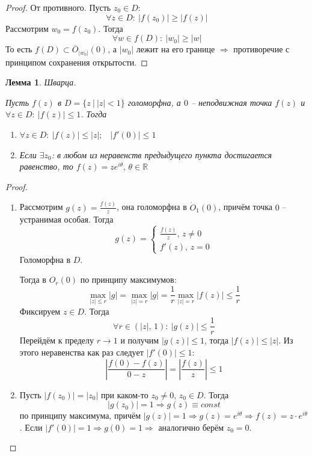 \documentclass[a4paper,12pt]{article}
\renewcommand{\leq}{\ensuremath{\leqslant}}
\renewcommand{\geq}{\ensuremath{\geqslant}}
\theoremstyle{plain}
\newtheorem{lemma}{Лемма}[section]
\theoremstyle{definition}
\theoremstyle{remark}
\begin{document}
\begin{proof}
	От противного. Пусть $z_0 \in D$:
	\[
		\forall z \in D :\: \vert f(z_0)\vert \geq \vert f(z)\vert
	\]
	Рассмотрим $w_0 = f(z_0)$. Тогда
	\[
		\forall w \in f(D) :\: \vert w_0\vert \geq \vert w\vert
	\]
	То есть $f(D) \subset \overline{O}_{\vert w_0\vert}(0)$, а $\vert w_0\vert$ лежит на его границе $\Rightarrow$ противоречие с принципом сохранения открытости.
\end{proof}

\begin{lemma}
	Шварца.

	Пусть $f(z)$ в $D = \{z \:\vert\: \vert z\vert < 1\}$ голоморфна, а $0$ -- неподвижная точка $f(z)$ и $\forall z \in D :\: \vert f(z)\vert \leq 1$. Тогда
	\begin{enumerate}
		\item $\forall z \in D :\: \vert f(z)\vert \leq \vert z\vert ;\;\;\; \vert f'(0)\vert \leq 1$
		\item Если $\exists z_0$: в любом из неравенств предыдущего пункта достигается равенство, то $f(z) = ze^{i\theta},\, \theta \in \mathbb{R}$
	\end{enumerate}
\end{lemma}

\begin{proof}
	\begin{enumerate}
		\item Рассмотрим $g(z) = \frac{f(z)}{z}$, она голоморфна в $\dot{O}_1(0)$, причём точка $0$ -- устранимая особая. Тогда
		      \[
			      g(z) = \begin{cases}
				      \frac{f(z)}{z},\, z \neq 0 \\
				      f'(z),\, z = 0
			      \end{cases}
		      \]
		      Голоморфна в $D$.

		      Тогда в $O_r(0)$ по принципу максимумов:
		      \[
			      \max_{\vert z\vert \leq r} \vert g\vert = \max_{\vert z\vert = r}\vert g\vert = \frac{1}{r}\max_{\vert z\vert = r} \vert f(z)\vert \leq \frac{1}{r}
		      \]
		      Фиксируем $z \in D$. Тогда
		      \[
			      \forall r \in (\vert z\vert,\, 1) :\: \vert g(z)\vert \leq \frac{1}{r}
		      \]
		      Перейдём к пределу $r \to 1$ и получим $\vert g(z)\vert \leq 1$, тогда $\vert f(z)\vert \leq \vert z\vert$. Из этого неравенства как раз следует $\vert f'(0)\vert \leq 1$:
		      \[
			      \left\vert \frac{f(0) - f(z)}{0 - z}\right\vert = \left\vert \frac{f(z)}{z}\right\vert \leq 1
		      \]
		\item Пусть $\vert f(z_0)\vert = \vert z_0\vert$ при каком-то $z_0 \neq 0,\, z_0 \in D$. Тогда
		      \[
			      \vert g(z_0)\vert = 1\Rightarrow g(z) \equiv const
		      \]
		      по принципу максимума, причём $\vert g(z)\vert = 1 \Rightarrow g(z) = e^{i\theta} \Rightarrow f(z) = z\cdot e^{i\theta}$. Если $\vert f'(0)\vert = 1 \Rightarrow g(0) = 1 \Rightarrow$ аналогично берём $z_0 = 0$.
	\end{enumerate}
\end{proof}
\end{document}
